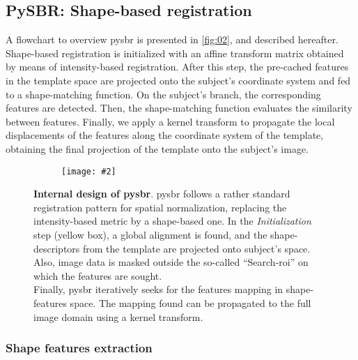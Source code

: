 \documentclass{frontiers}
\newcommand{\insertgraphic}[2]{\texttt{[image: \#2]}}
\newcommand{\insertgraphic}[2]{\texttt{[image: \#2]}}
\begin{document}
\subsection{PySBR: Shape-based registration}
A flowchart to overview \gls*{pysbr} is presented in \autoref{fig:02},
  and described hereafter.
Shape-based registration is initialized with an affine transform matrix
  obtained by means of intensity-based registration.
After this step, the pre-cached features in the template space are projected
  onto the subject's coordinate system and fed to a shape-matching function.
On the subject's branch, the corresponding features are detected.
Then, the shape-matching function evaluates the similarity between features.
Finally, we apply a kernel transform to propagate the local displacements of
  the features along the coordinate system of the template, obtaining the final
  projection of the template onto the subject's image.

\begin{figure*}[!ht]
\centering
  \begin{subfigure}[bt]{0.65\textwidth}
    \insertgraphic{width=\linewidth}{figures/02-RegistrationFlowDiagram}
  \end{subfigure}
  \hfill
  \begin{minipage}[bt]{0.30\textwidth}
  \caption{\label{fig:02}
  \textbf{Internal design of \gls*{pysbr}}. \Gls*{pysbr} follows a rather standard
  registration pattern for spatial normalization, replacing the intensity-based
  metric by a shape-based one. In the \emph{Initialization} step (yellow box),
  a global alignment is found, and the shape-descriptors from the template
  are projected onto subject's space. Also, image data is masked outside the
  so-called ``Search-\gls*{roi}'' on which the features are sought. \\
  Finally, \gls*{pysbr} iteratively seeks for the features mapping in
  shape-features space. The mapping found can be propagated to the full
  image domain using a kernel transform.
  }
  \end{minipage}
\end{figure*}


\subsubsection{Shape features extraction}
\label{sec:shape_features}
\end{document}
